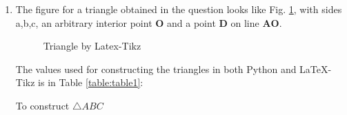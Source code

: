 \renewcommand{\vec}[1]{\mathbf{#1}}
    

\begin{enumerate}
\item
The figure for a triangle obtained in the question looks like Fig. \ref{fig:similar}, with sides a,b,c, an arbitrary interior point $\vec{O}$ and a point $\vec{D}$ on line $\vec{AO}$.  
\begin{figure}[!ht]
\centering
\resizebox{\columnwidth}{!}{}
\caption{Triangle by Latex-Tikz}
\label{fig:similar}	
\end{figure}

The values used for constructing the triangles in both Python and \LaTeX{}-Tikz is in Table \ref{table:table1}:\\
\begin{table}[ht]
    \begin{center}
    	
  \caption{To construct $\triangle ABC$}
   \label{table:table1}
   \end{center}	
\end{table}

\end{enumerate}
